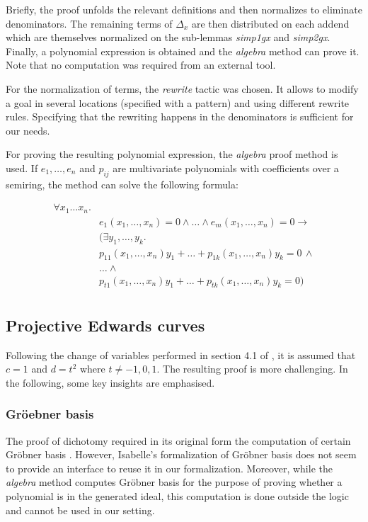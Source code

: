 \documentclass[runningheads]{llncs}
\begin{document}
Briefly, the proof unfolds the relevant definitions and then normalizes to eliminate denominators. The remaining terms of $\Delta_x$ are then distributed on each addend which are themselves normalized on the sub-lemmas \textit{simp1gx} and \textit{simp2gx}. Finally, a polynomial expression is obtained and the \textit{algebra} method can prove it. Note that no computation was required from an external tool. 

For the normalization of terms, the \textit{rewrite} tactic \cite{noschinskipattern} was chosen. It allows to modify a goal in several locations (specified with a pattern) and using different rewrite rules. Specifying that the rewriting happens in the denominators is sufficient for our needs.

For proving the resulting polynomial expression, the \textit{algebra} proof method \cite{chaieb2007context} is used. If $e_1,\ldots,e_n$ and $p_{ij}$ are multivariate polynomials with coefficients over a semiring, the method can solve the following formula:

\begin{align*}
\forall x_1 \ldots x_n. &  \\        
& e_1(x_1,\ldots,x_n) = 0 \land \ldots \land e_m(x_1,\ldots,x_n) = 0 \to \\
& (\exists y_1, \ldots, y_k. \\
& p_{11}(x_1,\ldots,x_n) y_1 + \ldots + p_{1k}(x_1,\ldots,x_n) y_k = 0 \, \land \\
& \ldots \land \\
& p_{t1}(x_1,\ldots,x_n) y_1 + \ldots + p_{tk}(x_1,\ldots,x_n) y_k = 0) \\
&
\end{align*}

\subsection{Projective Edwards curves}

Following the change of variables performed in section 4.1 of \cite{hales2016group}, it is assumed that $c = 1$ and $d = t^2$ where $t \neq -1,0,1$. The resulting proof is more challenging. In the following, some key insights are emphasised. 

\subsubsection{Gr\"{o}ebner basis}

The proof of dichotomy required in its original form the computation of certain Gr\"{o}bner basis \cite{hales2016group}. However, Isabelle's formalization of Gr\"{o}bner basis \cite{maletzky2018grobner} does not seem to provide an interface to reuse it in our formalization. Moreover, while the \textit{algebra} method computes Gr\"{o}bner basis for the purpose of proving whether a polynomial is in the generated ideal, this computation is done outside the logic and cannot be used in our setting.
\end{document}

